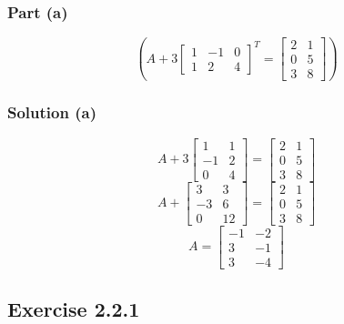 \documentclass[12pt]{article}
\begin{document}
\subsubsection*{Part (a)}
\[
  \begin{equation*}
    \left(A + 3\begin{bmatrix}
        1 & -1 & 0\\ 
        1 & 2 & 4 
    \end{bmatrix}^T
    = \begin{bmatrix}
      2 & 1\\ 
      0 & 5\\ 
      3 & 8 
    \end{bmatrix}
    \right)
  \end{equation*}
\]
\subsubsection*{Solution (a)}
\begin{equation*}
  A + 3\begin{bmatrix}
    1 & 1\\ 
    -1 & 2\\ 
    0 & 4 
  \end{bmatrix}
  = \begin{bmatrix}
    2 & 1\\ 
    0 & 5\\ 
    3 & 8 
  \end{bmatrix}
\end{equation*}
\begin{equation*}
  A + \begin{bmatrix}
    3 & 3\\ 
    -3 & 6\\ 
    0 & 12 
  \end{bmatrix}
  = \begin{bmatrix}
    2 & 1\\ 
    0 & 5\\ 
    3 & 8 
  \end{bmatrix}
\end{equation*}
\begin{equation*}
  A = \begin{bmatrix}
    -1 & -2\\ 
    3 & -1\\ 
    3 & -4
  \end{bmatrix}
\end{equation*}
\vspace{2in}
\subsection*{Exercise 2.2.1}
\vspace{0.25in}
\end{document}
